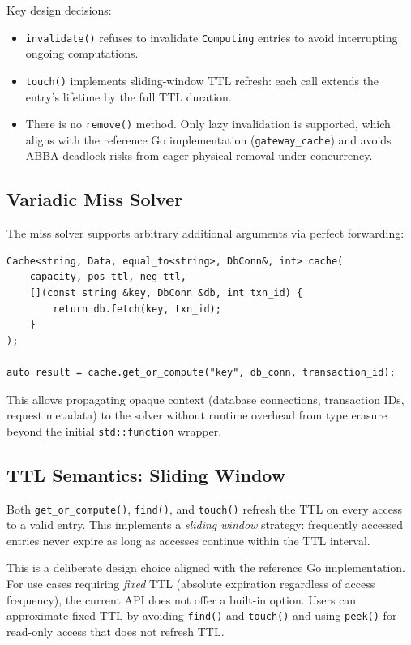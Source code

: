 \documentclass[11pt,a4paper]{article}
\begin{document}
Key design decisions:
\begin{itemize}
\item \texttt{invalidate()} refuses to invalidate \texttt{Computing}
      entries to avoid interrupting ongoing computations.
\item \texttt{touch()} implements sliding-window TTL refresh: each call
      extends the entry's lifetime by the full TTL duration.
\item There is no \texttt{remove()} method.  Only lazy invalidation is
      supported, which aligns with the reference Go implementation
      (\texttt{gateway\_cache}) and avoids ABBA deadlock risks from
      eager physical removal under concurrency.
\end{itemize}

\subsection{Variadic Miss Solver}

The miss solver supports arbitrary additional arguments via perfect
forwarding:

\begin{lstlisting}[caption=Variadic API with type-safe context propagation]
Cache<string, Data, equal_to<string>, DbConn&, int> cache(
    capacity, pos_ttl, neg_ttl,
    [](const string &key, DbConn &db, int txn_id) {
        return db.fetch(key, txn_id);
    }
);

auto result = cache.get_or_compute("key", db_conn, transaction_id);
\end{lstlisting}

This allows propagating opaque context (database connections, transaction
IDs, request metadata) to the solver without runtime overhead from type
erasure beyond the initial \texttt{std::function} wrapper.

\subsection{TTL Semantics: Sliding Window}

Both \texttt{get\_or\_compute()}, \texttt{find()}, and \texttt{touch()}
refresh the TTL on every access to a valid entry.  This implements a
\emph{sliding window} strategy: frequently accessed entries never expire
as long as accesses continue within the TTL interval.

This is a deliberate design choice aligned with the reference Go
implementation.  For use cases requiring \emph{fixed} TTL (absolute
expiration regardless of access frequency), the current API does not
offer a built-in option.  Users can approximate fixed TTL by avoiding
\texttt{find()} and \texttt{touch()} and using \texttt{peek()} for
read-only access that does not refresh TTL.
\end{document}
